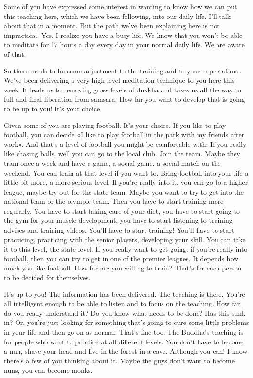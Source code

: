 \documentclass[letterpaper,10pt,english]{sphinxmanual}
\begin{document}
\sphinxAtStartPar
Some of you have expressed some interest in wanting to know how we
can put this teaching here, which we have been following, into our daily life.
I’ll talk about that in a moment. But the path we’ve been explaining here is
not impractical. Yes, I realize you have a busy life. We know that you won’t
be able to meditate for 17 hours a day every day in your normal daily life.
We are aware of that.

\sphinxAtStartPar
So there needs to be some adjustment to the training and to your expectations. We’ve been delivering a very high level meditation technique to you
here this week. It leads us to removing gross levels of dukkha and takes us
all the way to full and final liberation from samsara.
How far you want to develop that is going to be
  up to you! It’s your choice.

\sphinxAtStartPar
Given some of you are playing football. It’s your choice. If you like
to play football, you can decide «I like to play football in the park with my
friends after work». And that’s a level of football you might be comfortable
with. If you really like chasing balls, well you can go to the local club. Join
the team. Maybe they train once a week and have a game, a social game,
a social match on the weekend. You can train at that level if you want to.
Bring football into your life a little bit more, a more serious level. If you’re
really into it, you can go to a higher league, maybe try out for the state team.
Maybe you want to try to get into the national team or the olympic team.
Then you have to start training more regularly. You have to start taking care
of your diet, you have to start going to the gym for your muscle development,  you  have  to  start  listening  to  training  advises  and  training  videos.
You’ll have to start training! You’ll have to start practicing, practicing with
the senior players, developing your skill. You can take it to this level, the
state level. If you really want to get going, if you’re really into football, then
you can try to get in one of the premier leagues. It depends how much you
like football. How far are you willing to train? That’s for each person to be
decided for themselves.

\sphinxAtStartPar
It’s  up  to  you!  The  information  has  been  delivered.  The  teaching  is
there. You’re all intelligent enough to be able to listen and to focus on the
teaching. How far do you really understand it? Do you know what needs to
be done? Has this sunk in? Or, you’re just looking for something that’s going
to cure some little problems in your life and then go on as normal. That’s
fine  too.  The  Buddha’s  teaching  is  for  people  who  want  to  practice  at  all
different levels. You don’t have to become a nun, shave your head and live
in the forest in a cave. Although you can! I know there’s a few of you thinking about it. Maybe the guys don’t want to become nuns, you can become
monks.
\end{document}

